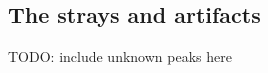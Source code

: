 






\subsection{The strays and artifacts}
\label{sec:discussion:general:strays}



TODO: include unknown peaks here









